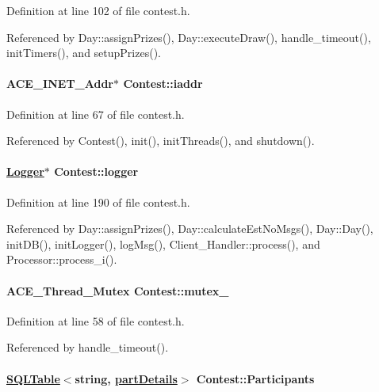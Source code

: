 Definition at line 102 of file contest.h.

Referenced by Day::assign\-Prizes(), Day::execute\-Draw(), handle\_\-timeout(), init\-Timers(), and setup\-Prizes().\hypertarget{classContest_Contesto3}{
\paragraph[iaddr]{\setlength{\rightskip}{0pt plus 5cm}ACE\_\-INET\_\-Addr$\ast$ Contest::iaddr}\hfill}
\label{classContest_Contesto3}




Definition at line 67 of file contest.h.

Referenced by Contest(), init(), init\-Threads(), and shutdown().\hypertarget{classContest_Contestm14}{
\paragraph[logger]{\setlength{\rightskip}{0pt plus 5cm}\hyperlink{classLogger}{Logger}$\ast$ Contest::logger}\hfill}
\label{classContest_Contestm14}




Definition at line 190 of file contest.h.

Referenced by Day::assign\-Prizes(), Day::calculate\-Est\-No\-Msgs(), Day::Day(), init\-DB(), init\-Logger(), log\-Msg(), Client\_\-Handler::process(), and Processor::process\_\-i().\hypertarget{classContest_Contesto0}{
\paragraph[mutex\_\-]{\setlength{\rightskip}{0pt plus 5cm}ACE\_\-Thread\_\-Mutex Contest::mutex\_\-}\hfill}
\label{classContest_Contesto0}




Definition at line 58 of file contest.h.

Referenced by handle\_\-timeout().\hypertarget{classContest_Contestm8}{
\paragraph[Participants]{\setlength{\rightskip}{0pt plus 5cm}\hyperlink{classSQLTable}{SQLTable}$<$string, \hyperlink{classpartDetails}{part\-Details}$>$ Contest::Participants}\hfill}
\label{classContest_Contestm8}




